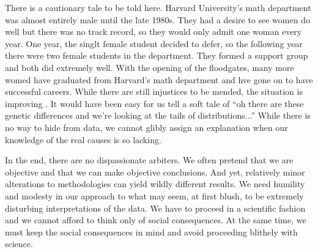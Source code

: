 There is a cautionary tale to be told here.
Harvard University's math department was almost entirely male until the late 1980s.
They had a desire to see women do well but there was no track record, so they would only admit one woman every year.
One year, the singlt female student decided to defer, so the following year there were two female students in the department.
They formed a support group and both did extremely well.
With the opening of the floodgates, many more womed have graduated from Harvard's math department and hve gone on to have successful careers.
While there are still injustices to be mended, the situation is improving \cite{Jackson2004}.
It would have been easy for us tell a soft tale of ``oh there are these genetic differences and we're looking at the tails of distributions...''
While there is no way to hide from data, we cannot glibly assign an explanation when our knowledge of the real causes is so lacking.

In the end, there are no dispassionate arbiters.
We often pretend that we are objective and that we can make objective conclusions.
And yet, relatively minor alterations to methodologies can yield wildly different results.
We need humility and modesty in our approach to what may seem, at first blush, to be extremely disturbing interpretations of the data.
We have to proceed in a scientific fashion and we cannot afford to think only of social consequences.
At the same time, we must keep the social consequences in mind and avoid proceeding blithely with science.
